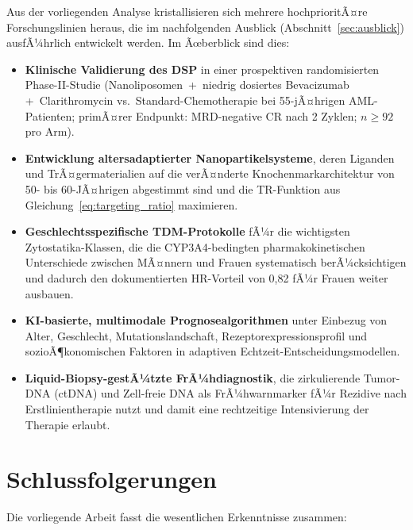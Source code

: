 ﻿\documentclass[12pt,a4paper]{article}
\theoremstyle{definition}
\begin{document}
Aus der vorliegenden Analyse kristallisieren sich mehrere hochprioritÃ¤re
Forschungslinien heraus, die im nachfolgenden Ausblick (Abschnitt~\ref{sec:ausblick})
ausfÃ¼hrlich entwickelt werden. Im Ãœberblick sind dies:
\begin{itemize}
  \item \textbf{Klinische Validierung des DSP} in einer prospektiven randomisierten
        Phase-II-Studie (Nanoliposomen~+~niedrig dosiertes Bevacizumab
        +~Clarithromycin vs.~Stan\-dard-Chemotherapie bei 55-jÃ¤hrigen AML-Patienten;
        primÃ¤rer Endpunkt: MRD-negative CR nach 2 Zyklen; $n\geq 92$ pro Arm).
  \item \textbf{Entwicklung altersadaptierter Nanopartikelsysteme}, deren Liganden
        und TrÃ¤germaterialien auf die verÃ¤nderte Knochenmarkarchitektur von
        50- bis 60-JÃ¤hrigen abgestimmt sind und die TR-Funktion aus
        Gleichung~\eqref{eq:targeting_ratio} maximieren.
  \item \textbf{Geschlechtsspezifische TDM-Protokolle} fÃ¼r die wichtigsten
        Zytostatika-Klassen, die die CYP3A4-bedingten pharmakokinetischen
        Unterschiede zwischen MÃ¤nnern und Frauen systematisch berÃ¼cksichtigen und
        dadurch den dokumentierten HR-Vorteil von 0,82 fÃ¼r Frauen weiter ausbauen.
  \item \textbf{KI-basierte, multimodale Prognosealgorithmen} unter Einbezug von
        Alter, Geschlecht, Mutationslandschaft, Rezeptorexpressionsprofil und
        sozioÃ¶konomischen Faktoren in adaptiven Echtzeit-Entscheidungsmodellen.
  \item \textbf{Liquid-Biopsy-gestÃ¼tzte FrÃ¼hdiagnostik}, die zirkulierende
        Tumor-DNA (ctDNA) und Zell-freie DNA als FrÃ¼hwarnmarker fÃ¼r Rezidive
        nach Erstlinientherapie nutzt und damit eine rechtzeitige Intensivierung
        der Therapie erlaubt.
\end{itemize}

\section{Schlussfolgerungen}
\label{sec:schluss}

Die vorliegende Arbeit fasst die wesentlichen Erkenntnisse zusammen:
\end{document}
